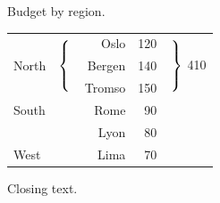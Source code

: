 \documentclass{article}
\begin{document}
Budget by region.

\begin{tabular}{llrrl}
\multirow{3}{*}{North} & \multirow{3}{*}{$\left\{\rule{0pt}{24pt}\right.$} & Oslo & 120 & \multirow{3}{*}{$\left.\rule{0pt}{24pt}\right\}$ 410} \\
 & & Bergen & 140 & \\
 & & Tromso & 150 & \\
South & & Rome & 90 & \\
 & & Lyon & 80 & \\
West & & Lima & 70 & \\
\end{tabular}

Closing text.
\end{document}

